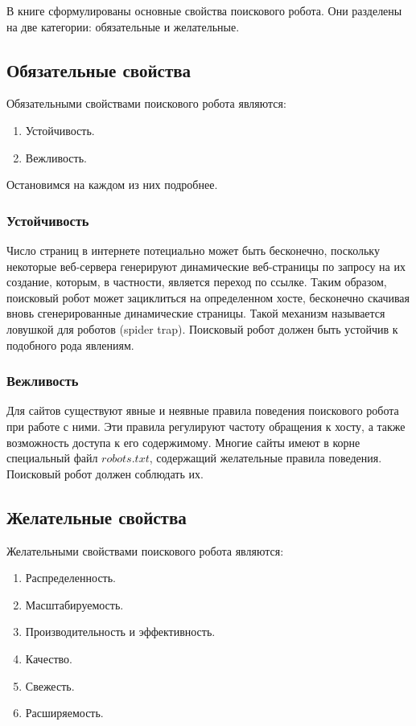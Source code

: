 В книге \cite{Manning} сформулированы основные свойства поискового робота. Они разделены на две категории: обязательные и желательные.

\subsection{Обязательные свойства}

Обязательными свойствами поискового робота являются:
\begin{enumerate}
\item Устойчивость. 
\item Вежливость. 
\end{enumerate}

Остановимся на каждом из них подробнее.

\subsubsection*{Устойчивость}

Число страниц в интернете потециально может быть бесконечно, поскольку некоторые веб-сервера генерируют динамические веб-страницы по запросу на их создание, которым, в частности, является переход по ссылке. Таким образом, поисковый робот может зациклиться на определенном хосте, бесконечно скачивая вновь сгенерированные динамические страницы. Такой механизм называется ловушкой для роботов (spider trap). Поисковый робот должен быть устойчив к подобного рода явлениям.

\subsubsection*{Вежливость}

Для сайтов существуют явные и неявные правила поведения поискового робота при работе с ними. Эти правила регулируют частоту обращения к хосту, а также возможность доступа к его содержимому. Многие сайты имеют в корне специальный файл $robots.txt$, содержащий желательные правила поведения. Поисковый робот должен соблюдать их.

\subsection{Желательные свойства}

Желательными свойствами поискового робота являются:

\begin{enumerate}
\item Распределенность.
\item Масштабируемость.
\item Производительность и эффективность.
\item Качество.
\item Свежесть.
\item Расширяемость.
\end{enumerate}

